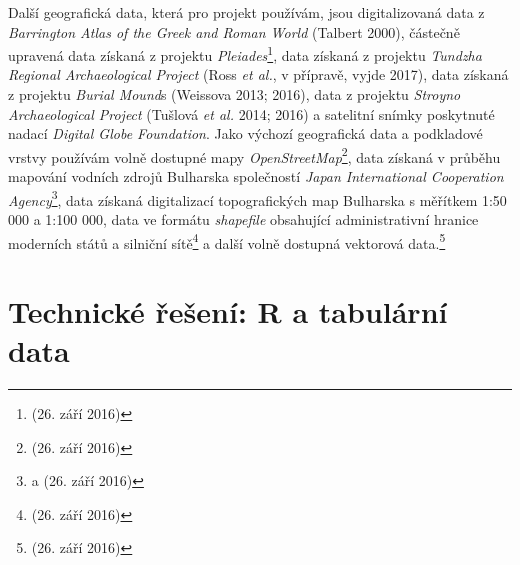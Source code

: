 Další geografická data, která pro projekt používám, jsou digitalizovaná data z {\em Barrington Atlas of the Greek and Roman World} (Talbert 2000), částečně upravená data získaná z projektu {\em Pleiades}\footnote{\from[url9] (26. září 2016)}, data získaná z projektu {\em Tundzha Regional Archaeological Project} (Ross {\em et al.}, v přípravě, vyjde 2017), data získaná z projektu {\em Burial Mound}s (Weissova 2013; 2016), data z projektu {\em Stroyno Archaeological Project} (Tušlová {\em et al.} 2014; 2016) a satelitní snímky poskytnuté nadací {\em Digital Globe Foundation}. Jako výchozí geografická data a podkladové vrstvy používám volně dostupné mapy {\em OpenStreetMap}\footnote{\from[url10] (26. září 2016)}, data získaná v průběhu mapování vodních zdrojů Bulharska společností {\em Japan International Cooperation Agency}\footnote{\from[url11] a \from[url12] (26. září 2016)}, data získaná digitalizací topografických map Bulharska s měřítkem 1:50 000 a 1:100 000, data ve formátu {\em shapefile} obsahující administrativní hranice moderních států a silniční sítě\footnote{\from[url13] (26. září 2016)} a další volně dostupná vektorová data.\footnote{\from[url14] (26. září 2016)}

\section[technické-řešení-r-a-tabulární-data]{Technické řešení: R a tabulární data}

